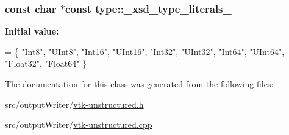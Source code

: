 \subsubsection[{\texorpdfstring{\+\_\+xsd\+\_\+type\+\_\+literals\+\_\+}{_xsd_type_literals_}}]{\setlength{\rightskip}{0pt plus 5cm}const char $\ast$const type\+::\+\_\+xsd\+\_\+type\+\_\+literals\+\_\+\hspace{0.3cm}{\ttfamily [static]}}\hypertarget{classtype_a2e3db93564deb68a52e1e54dcb82b41f}{}\label{classtype_a2e3db93564deb68a52e1e54dcb82b41f}
{\bfseries Initial value\+:}
\begin{DoxyCode}
=
\{
  \textcolor{stringliteral}{"Int8"},
  \textcolor{stringliteral}{"UInt8"},
  \textcolor{stringliteral}{"Int16"},
  \textcolor{stringliteral}{"UInt16"},
  \textcolor{stringliteral}{"Int32"},
  \textcolor{stringliteral}{"UInt32"},
  \textcolor{stringliteral}{"Int64"},
  \textcolor{stringliteral}{"UInt64"},
  \textcolor{stringliteral}{"Float32"},
  \textcolor{stringliteral}{"Float64"}
\}
\end{DoxyCode}


The documentation for this class was generated from the following files\+:\begin{DoxyCompactItemize}
\item 
src/output\+Writer/\hyperlink{vtk-unstructured_8h}{vtk-\/unstructured.\+h}\item 
src/output\+Writer/\hyperlink{vtk-unstructured_8cpp}{vtk-\/unstructured.\+cpp}\end{DoxyCompactItemize}
